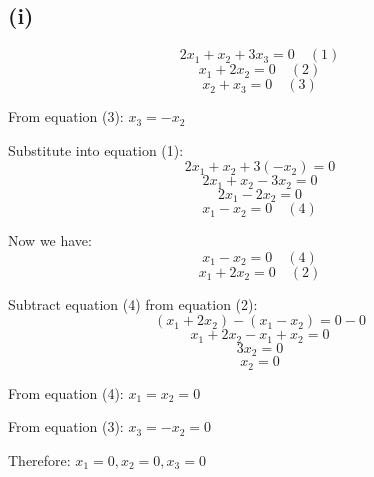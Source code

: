 \subsection*{(i)}
\[
	2x_1 + x_2 + 3x_3 = 0 \quad (1)
\]
\[
	x_1 + 2x_2 = 0 \quad (2)
\]
\[
	x_2 + x_3 = 0 \quad (3)
\]

From equation (3): $x_3 = -x_2$

Substitute into equation (1):
\[
	2x_1 + x_2 + 3(-x_2) = 0
\]
\[
	2x_1 + x_2 - 3x_2 = 0
\]
\[
	2x_1 - 2x_2 = 0
\]
\[
	x_1 - x_2 = 0 \quad (4)
\]

Now we have:
\[
	x_1 - x_2 = 0 \quad (4)
\]
\[
	x_1 + 2x_2 = 0 \quad (2)
\]

Subtract equation (4) from equation (2):
\[
	(x_1 + 2x_2) - (x_1 - x_2) = 0 - 0
\]
\[
	x_1 + 2x_2 - x_1 + x_2 = 0
\]
\[
	3x_2 = 0
\]
\[
	x_2 = 0
\]

From equation (4): $x_1 = x_2 = 0$

From equation (3): $x_3 = -x_2 = 0$

Therefore: $x_1 = 0, x_2 = 0, x_3 = 0$